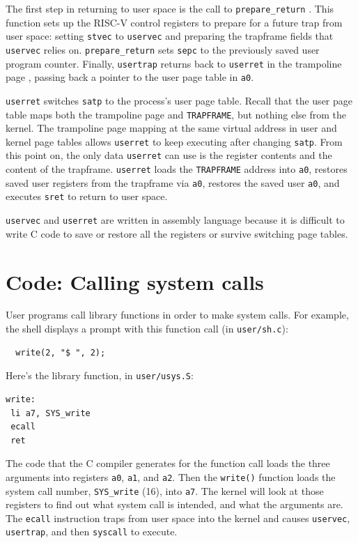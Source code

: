 The first step in returning to user space is the call to {\tt prepare\_return}
.
This function sets up the RISC-V control registers to prepare for a
future trap from user space: setting {\tt stvec}
to {\tt uservec} and preparing the trapframe fields that
{\tt uservec} relies on.
{\tt prepare\_return} sets {\tt sepc} to the previously
saved user program counter.
Finally, {\tt usertrap}
returns back to {\tt userret} in the trampoline page
,
passing back a pointer to the user page table in {\tt a0}.

{\tt userret} switches {\tt satp} to the process's user page table.
Recall that the user page table maps both the trampoline page
and {\tt TRAPFRAME}, but nothing else from the kernel.
The trampoline page mapping at the same
virtual address in user and kernel page tables allows
{\tt userret} to keep executing after changing {\tt satp}.
From this point on, the only data {\tt userret} can use is
the register contents and the content of the trapframe.
{\tt userret} loads the {\tt TRAPFRAME} address into {\tt a0},
restores saved user registers from the trapframe via {\tt a0},
restores the saved user {\tt a0},
and executes {\tt sret} to return to user space.

{\tt uservec} and {\tt userret} are written in assembly
language because it is difficult to write C code to
save or  restore all the registers or survive switching
page tables.

\section{Code: Calling system calls}

User programs call library functions in order to make system calls.
For example, the shell displays a prompt with this function call
(in {\tt user/sh.c}):

\begin{verbatim}
  write(2, "$ ", 2);
\end{verbatim}

Here's the library function, in {\tt user/usys.S}:

\begin{verbatim}
write:
 li a7, SYS_write
 ecall
 ret
\end{verbatim}

The code that the C compiler generates for the function call
loads the three arguments into registers {\tt a0},
{\tt a1}, and {\tt a2}. Then the {\tt write()} function
loads the system call number, {\tt SYS\_write} (16), into {\tt a7}.
The kernel will look at those registers to find out what
system call is intended, and what the arguments are.
The \lstinline{ecall} instruction traps from user space
into the kernel and causes
{\tt uservec},
{\tt usertrap}, and then {\tt syscall} to execute.

